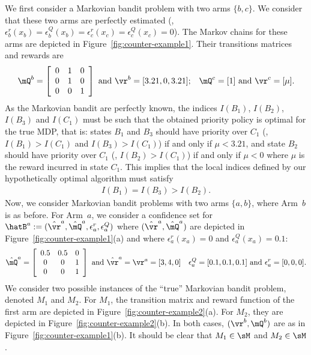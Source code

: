 \begin{subappendices}
We first consider a Markovian bandit problem with two arms $\{b,c\}$. We consider that these two arms are perfectly estimated (\ie, $\epsilon^r_b(x_b)=\epsilon^Q_b(x_b)=\epsilon^r_c(x_c)=\epsilon^Q_c(x_c)=0$). The Markov chains for these arms are depicted in Figure~\ref{fig:counter-example1}. Their transitions matrices and rewards are
\begin{align*}
    \mQ^b = \left[\begin{array}{ccc}
        0 & 1 & 0\\
        0 & 1 & 0\\
        0 & 0 & 1
    \end{array}\right]
    \text{ and } \vr^b = [3.21,0,3.21];
    && \mQ^c = [1] \text{ and } \vr^c = [\mu].
\end{align*}
As the Markovian bandit are perfectly known, the indices $I(B_1)$, $I(B_2)$, $I(B_3)$ and $I(C_1)$ must be such that the obtained priority policy is optimal for the true MDP, that is: states $B_1$ and $B_3$ should have priority over $C_1$ (\ie, $I(B_1)>I(C_1)$ and $I(B_3)>I(C_1)$) if and only if $\mu<3.21$, and state $B_2$ should have priority over $C_1$ (\ie, $I(B_2)>I(C_1)$) if and only if $\mu<0$ where $\mu$ is the reward incurred in state $C_1$. This implies that the local indices defined by our hypothetically optimal algorithm must satisfy
\begin{align*}
    I(B_1) = I(B_3) > I(B_2).
\end{align*}
Now, we consider Markovian bandit problems with two arms $\{a,b\}$, where Arm~$b$ is as before. For Arm~$a$, we consider a confidence set for $\hatB^a:=(\hat{\vr}^a,\hat{\mQ}^a,\epsilon^r_a,\epsilon^Q_a)$
where $(\hat{\vr}^a,\hat{\mQ}^a)$ are depicted in Figure~\ref{fig:counter-example1}(a) and where $\epsilon^r_a(x_a)=0$ and $\epsilon^Q_a(x_a)=0.1$:
\begin{align*}
    \hat{\mQ}^a = \left[\begin{array}{ccc}
        0.5 & 0.5 & 0\\
        0 & 0 & 1\\
        0 & 0 & 1
    \end{array}\right]
    \text{ and }\hat{\vr}^a = \vr^a = [3, 4, 0]
    &&\epsilon_a^Q = [0.1, 0.1, 0.1] \text{ and }\epsilon_a^r=[0,0,0].
\end{align*}
We consider two possible instances of the ``true'' Markovian bandit problem, denoted $M_1$ and $M_2$. For $M_1$, the transition matrix and reward function of the first arm are depicted in Figure~\ref{fig:counter-example2}(a). For $M_2$, they are depicted in Figure~\ref{fig:counter-example2}(b). In both cases, $(\vr^b,\mQ^b)$ are as in Figure~\ref{fig:counter-example1}(b). It should be clear that $M_1\in\sM$ and $M_2\in\sM$. 


\end{subappendices}
